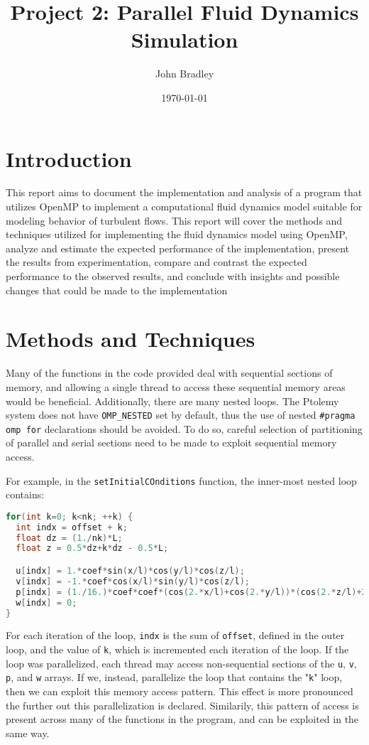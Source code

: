 \documentclass{article}
\title{Project 2: Parallel Fluid Dynamics Simulation}
\author{John Bradley}
\date{\today}
\begin{document}
  \maketitle

  \section{Introduction}

  This report aims to document the implementation and analysis of a program
  that utilizes OpenMP to implement a computational fluid dynamics model
  suitable for modeling behavior of turbulent flows. This report will cover the
  methods and techniques utilized for implementing the fluid dynamics model
  using OpenMP, analyze and estimate the expected performance of the 
  implementation, present the results from experimentation, compare and contrast 
  the expected performance to the observed results, and conclude with insights 
  and possible changes that could be made to the implementation
  
  \section{Methods and Techniques}

  Many of the functions in the code provided deal with sequential
  sections of memory, and allowing a single thread to access these sequential
  memory areas would be beneficial. Additionally, there are many nested loops.
  The Ptolemy system does not have \verb|OMP_NESTED| set by default, thus the
  use of nested \verb|#pragma omp for| declarations should be avoided. To do
  so, careful selection of partitioning of parallel and serial sections need to
  be made to exploit sequential memory access.

  For example, in the \verb|setInitialCOnditions| function, the inner-most
  nested loop contains:

  \begin{lstlisting}[language=C, linewidth=1\textwidth, breaklines=true]
for(int k=0; k<nk; ++k) {
  int indx = offset + k;
  float dz = (1./nk)*L;
  float z = 0.5*dz+k*dz - 0.5*L;

  u[indx] = 1.*coef*sin(x/l)*cos(y/l)*cos(z/l);
  v[indx] = -1.*coef*cos(x/l)*sin(y/l)*cos(z/l);
  p[indx] = (1./16.)*coef*coef*(cos(2.*x/l)+cos(2.*y/l))*(cos(2.*z/l)+2.);
  w[indx] = 0;
}
  \end{lstlisting}

  For each iteration of the loop, \verb|indx| is the sum of \verb|offset|,
  defined in the outer loop, and the value of \verb|k|, which is incremented
  each iteration of the loop. If the loop was parallelized, each thread may
  access non-sequential sections of the \verb|u|, \verb|v|, \verb|p|, and
  \verb|w| arrays. If we, instead, parallelize the loop that contains the
  "\verb|k|" loop, then we can exploit this memory access pattern. This effect
  is more pronounced the further out this parallelization is declared. 
  Similarily, this pattern of access is present across many of the functions in
  the program, and can be exploited in the same way.
\end{document}
